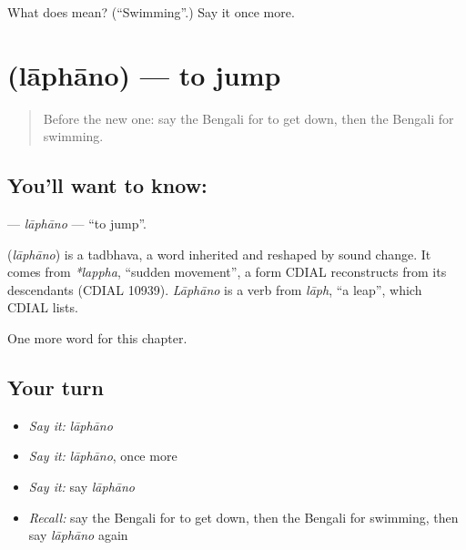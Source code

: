 \begin{tcolorbox}[breakable,colback=teal!4,colframe=teal!35!black,title={Before you move on}]
What does  mean? (\textquotedblleft{}Swimming\textquotedblright{}.) Say it once more.
\end{tcolorbox}
\section[\texorpdfstring{\bn{লাফানো} (lāphāno)}{লাফানো (lāphāno)}]{ (lāphāno) — to jump}

\label{lesson:BN-C103-laphano}



\begin{quote}
Before the new one: say the Bengali for to get down, then the Bengali for swimming.
\end{quote}

\subsection*{You'll want to know: }
\textbf{} — \emph{lāphāno} — \textquotedblleft{}to jump\textquotedblright{}.

\begin{cousinweb}
\textbf{} (\emph{lāphāno}) is a tadbhava, a word inherited and reshaped by sound change. It comes from \emph{*lappha}, \textquotedblleft{}sudden movement\textquotedblright{}, a form CDIAL reconstructs from its descendants (CDIAL 10939). \emph{Lāphāno} is a verb from \emph{lāph}, \textquotedblleft{}a leap\textquotedblright{}, which CDIAL lists.
\end{cousinweb}

\begin{grammarlens}[title={What you've built}]
One more word for this chapter.
\end{grammarlens}

\subsection*{Your turn}
\begin{itemize}
\raggedright
  \item \emph{Say it:} \emph{lāphāno}
  \item \emph{Say it:} \emph{lāphāno}, once more
  \item \emph{Say it:} say \emph{lāphāno}
  \item \emph{Recall:} say the Bengali for to get down, then the Bengali for swimming, then say \emph{lāphāno} again
\end{itemize}

